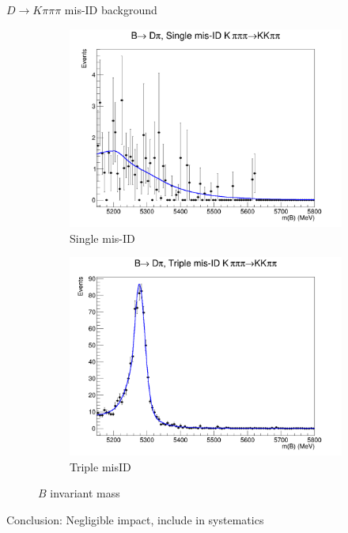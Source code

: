 \documentclass{beamer}
\begin{document}
\begin{frame}{$D\to K\pi\pi\pi$ mis-ID background}
  \begin{figure}
    \centering
    \begin{subfigure}{0.5\textwidth}
      \includegraphics[width = 1.0\textwidth]{Plots/Kpipipi_SingleMisID_Dpi_BMass.png}
      \caption{Single mis-ID}
    \end{subfigure}%
    \begin{subfigure}{0.5\textwidth}
      \includegraphics[width = 1.0\textwidth]{Plots/Kpipipi_TripleMisID_Dpi_BMass.png}
      \caption{Triple misID}
    \end{subfigure}
    \caption{$B$ invariant mass}
  \end{figure}
  \begin{center}
    Conclusion: Negligible impact, include in systematics
  \end{center}
\end{frame}
\end{document}
